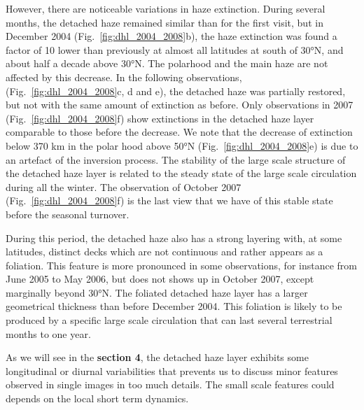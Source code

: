 However, there are noticeable variations in haze extinction. During several months, the
detached haze remained similar than for the first visit, but in December 2004 (Fig.~\ref{fig:dhl_2004_2008}b),
the haze extinction was found a factor of 10 lower than previously at almost all latitudes at south of \ang{30}N, and
about half a decade above \ang{30}N. The polarhood and the main haze are not affected by this decrease. In the following
observations, (Fig.~\ref{fig:dhl_2004_2008}c, d and e),
the detached haze was partially restored, but not with the same amount of extinction as before. Only observations in
2007 (Fig.~\ref{fig:dhl_2004_2008}f) show extinctions in the detached haze layer comparable to those before
the decrease. We note that the decrease of extinction below 370 km in the polar hood above \ang{50}N
(Fig.~\ref{fig:dhl_2004_2008}e) is due to an artefact of the inversion process. The stability of the large scale
structure of the detached haze layer is related to the steady state of the large scale circulation during all the winter.
The observation of October 2007 (Fig.~\ref{fig:dhl_2004_2008}f) is the last view that we have of this stable state
before the seasonal turnover.

During this period, the detached haze also has a strong layering with, at some latitudes, distinct decks which are not
continuous and rather appears as a foliation. This feature is more pronounced in some observations, for instance from
June 2005 to May 2006, but does not shows up in October 2007, except marginally beyond \ang{30}N. The foliated detached
haze layer has a larger geometrical thickness than before December 2004. This foliation is likely to be produced by a
specific large scale circulation that can last several terrestrial months to one year.


As we will see in the \textbf{section 4}, the detached haze layer exhibits some longitudinal or diurnal variabilities
that prevents us to discuss minor features observed in single images in too much details. The small scale features
could depends on the local short term dynamics.
